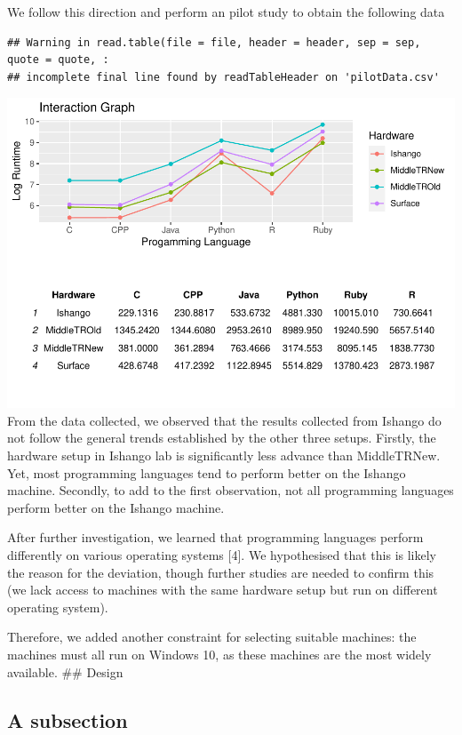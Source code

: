 \documentclass[12pt,halfline,a4paper,]{ouparticle}
\begin{document}
We follow this direction and perform an pilot study to obtain the
following data

\begin{verbatim}
## Warning in read.table(file = file, header = header, sep = sep, quote = quote, :
## incomplete final line found by readTableHeader on 'pilotData.csv'
\end{verbatim}

\includegraphics[width=1\linewidth]{skeleton_files/figure-latex/figPilot-1}
From the data collected, we observed that the results collected from
Ishango do not follow the general trends established by the other three
setups. Firstly, the hardware setup in Ishango lab is significantly less
advance than MiddleTRNew. Yet, most programming languages tend to
perform better on the Ishango machine. Secondly, to add to the first
observation, not all programming languages perform better on the Ishango
machine.

After further investigation, we learned that programming languages
perform differently on various operating systems {[}4{]}. We
hypothesised that this is likely the reason for the deviation, though
further studies are needed to confirm this (we lack access to machines
with the same hardware setup but run on different operating system).

Therefore, we added another constraint for selecting suitable machines:
the machines must all run on Windows 10, as these machines are the most
widely available. \#\# Design

\hypertarget{a-subsection}{%
\subsection{A subsection}\label{a-subsection}}
\end{document}
